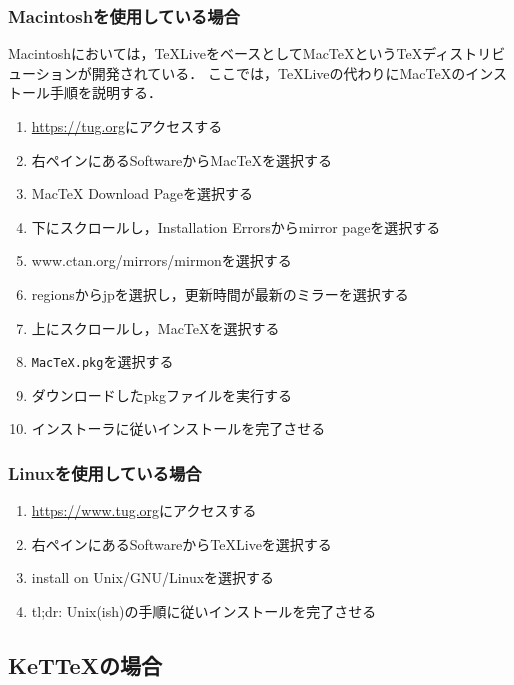 \subsubsection{Macintoshを使用している場合}
Macintoshにおいては，{\TeX}LiveをベースとしてMac{\TeX}という{\TeX}ディストリビューションが開発されている．
ここでは，{\TeX}Liveの代わりにMac{\TeX}のインストール手順を説明する．
\begin{enumerate}
    \item \url{https://tug.org}にアクセスする
    \item 右ペインにあるSoftwareからMacTeXを選択する
    \item MacTeX Download Pageを選択する
    \item 下にスクロールし，Installation Errorsからmirror pageを選択する
    \item www.ctan.org/mirrors/mirmonを選択する
    \item regionsからjpを選択し，更新時間が最新のミラーを選択する
    \item 上にスクロールし，MacTeXを選択する
    \item \verb|MacTeX.pkg|を選択する
    \item ダウンロードしたpkgファイルを実行する
    \item インストーラに従いインストールを完了させる
\end{enumerate}

\subsubsection{Linuxを使用している場合}
\begin{enumerate}
    \item \url{https://www.tug.org}にアクセスする
    \item 右ペインにあるSoftwareからTeXLiveを選択する
    \item install on Unix/GNU/Linuxを選択する
    \item tl;dr: Unix(ish)の手順に従いインストールを完了させる
\end{enumerate}

\subsection{KeT{\TeX}の場合}

